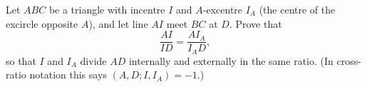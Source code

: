 Let $ABC$ be a triangle with incentre $I$ and $A$-excentre $I_A$ (the centre of the excircle opposite $A$), and let line $AI$ meet $BC$ at $D$. Prove that
\[\dfrac{AI}{ID}=\dfrac{AI_A}{I_AD},\]
so that $I$ and $I_A$ divide $AD$ internally and externally in the same ratio. (In cross-ratio notation this says $(A,D;I,I_A)=-1$.)
